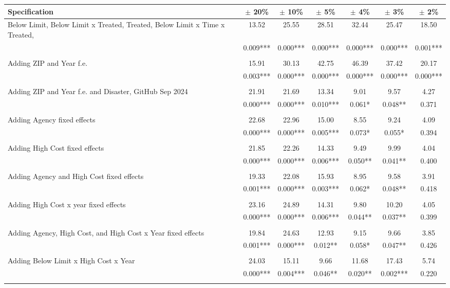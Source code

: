 \begin{tabular}{p{5cm}cccccc}
  \hline
Specification & $\pm$ 20\% & $\pm$ 10\% & $\pm$  5\% & $\pm$  4\% & $\pm$  3\% & $\pm$  2\% \\ 
  \hline
Below Limit, Below
Limit x Treated,
Treated, Below Limit
x Time x Treated, & 13.52 & 25.55 & 28.51 & 32.44 & 25.47 & 18.50 \\ 
   & 0.009*** & 0.000*** & 0.000*** & 0.000*** & 0.000*** & 0.001*** \\ 
   &  &  &  &  &  &  \\ 
  Adding ZIP and Year
f.e. & 15.91 & 30.13 & 42.75 & 46.39 & 37.42 & 20.17 \\ 
   & 0.003*** & 0.000*** & 0.000*** & 0.000*** & 0.000*** & 0.000*** \\ 
   &  &  &  &  &  &  \\ 
  Adding ZIP and Year
f.e. and Disaster,
GitHub Sep 2024 & 21.91 & 21.69 & 13.34 & 9.01 & 9.57 & 4.27 \\ 
   & 0.000*** & 0.000*** & 0.010*** & 0.061* & 0.048** & 0.371 \\ 
   &  &  &  &  &  &  \\ 
  Adding Agency fixed
effects & 22.68 & 22.96 & 15.00 & 8.55 & 9.24 & 4.09 \\ 
   & 0.000*** & 0.000*** & 0.005*** & 0.073* & 0.055* & 0.394 \\ 
   &  &  &  &  &  &  \\ 
  Adding High Cost
fixed effects & 21.85 & 22.26 & 14.33 & 9.49 & 9.99 & 4.04 \\ 
   & 0.000*** & 0.000*** & 0.006*** & 0.050** & 0.041** & 0.400 \\ 
   &  &  &  &  &  &  \\ 
  Adding Agency and
High Cost fixed
effects & 19.33 & 22.08 & 15.93 & 8.95 & 9.58 & 3.91 \\ 
   & 0.001*** & 0.000*** & 0.003*** & 0.062* & 0.048** & 0.418 \\ 
   &  &  &  &  &  &  \\ 
  Adding High Cost x
year fixed effects & 23.16 & 24.89 & 14.31 & 9.80 & 10.20 & 4.05 \\ 
   & 0.000*** & 0.000*** & 0.006*** & 0.044** & 0.037** & 0.399 \\ 
   &  &  &  &  &  &  \\ 
  Adding Agency, High
Cost, and High Cost
x Year fixed effects & 19.84 & 24.63 & 12.93 & 9.15 & 9.66 & 3.85 \\ 
   & 0.001*** & 0.000*** & 0.012** & 0.058* & 0.047** & 0.426 \\ 
   &  &  &  &  &  &  \\ 
  Adding Below Limit x
High Cost x Year & 24.03 & 15.11 & 9.66 & 11.68 & 17.43 & 5.74 \\ 
   & 0.000*** & 0.004*** & 0.046** & 0.020** & 0.002*** & 0.220 \\ 
   &  &  &  &  &  &  \\ 
   \hline
\end{tabular}

